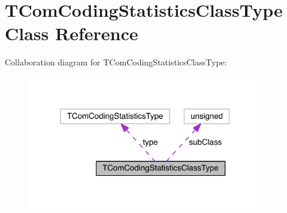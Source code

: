 \hypertarget{class_t_com_coding_statistics_class_type}{}\section{T\+Com\+Coding\+Statistics\+Class\+Type Class Reference}
\label{class_t_com_coding_statistics_class_type}


Collaboration diagram for T\+Com\+Coding\+Statistics\+Class\+Type\+:
\nopagebreak
\begin{figure}[H]
\begin{center}
\leavevmode
\includegraphics[width=292pt]{df/d9e/class_t_com_coding_statistics_class_type__coll__graph}
\end{center}
\end{figure}

